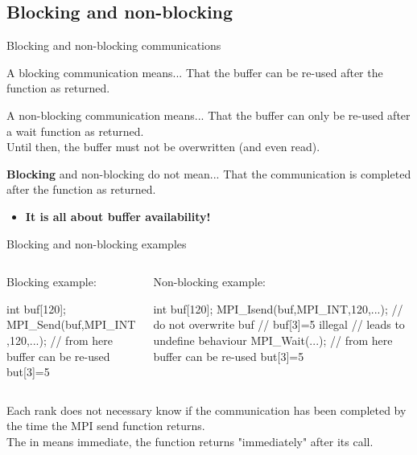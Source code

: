 \documentclass[aspectratio=43]{beamer}
\begin{document}
\subsection{Blocking and non-blocking}
\begin{frame}{Blocking and non-blocking communications}
\begin{green1block}{A blocking communication means...}
    That the buffer can be re-used after the function as returned.
\end{green1block}
\begin{green1block}{A non-blocking communication means...}
    That the buffer can only be re-used after a wait function as returned.\\
    Until then, the buffer must not be overwritten (and even read).
\end{green1block}
\begin{red1block}{\textbf{Blocking} and non-blocking do not mean...}
    That the communication is completed after the function as returned.
\end{red1block}
\begin{itemize}
    \item<2>[\color{cscsred}$\Rightarrow$]\color{cscsred}\textbf{It is all about buffer availability!}
\end{itemize}
\end{frame}


\begin{frame}[fragile]{Blocking and non-blocking examples}
    \begin{columns}
        \begin{column}{0.4\paperwidth}
            Blocking example:
\begin{Cpplisting}[]{}
int buf[120];
MPI_Send(buf,MPI_INT,120,...);
// from here buffer can be re-used
but[3]=5
\end{Cpplisting}
        \end{column}
        \begin{column}{0.4\paperwidth}
            Non-blocking example:
\begin{Cpplisting}[]{}
int buf[120];
MPI_Isend(buf,MPI_INT,120,...);
// do not overwrite buf
// buf[3]=5 illegal
// leads to undefine behaviour
MPI_Wait(...);
// from here buffer can be re-used
but[3]=5
\end{Cpplisting}
        \end{column}
    \end{columns}
Each rank does not necessary know if the communication has been completed by the time the MPI send function returns.\\
The  in  means {\color{cscsred}immediate}, the function returns "immediately" after its call.
\end{frame}
\end{document}
